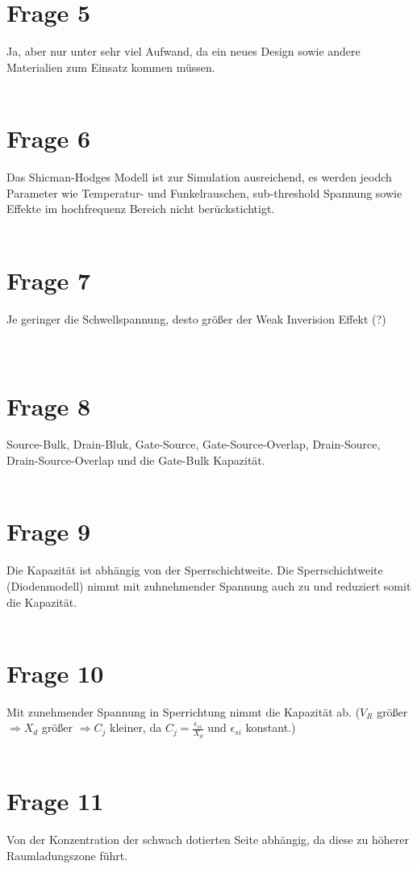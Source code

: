 \documentclass[a4paper]{scrartcl}
\begin{document}
\section*{Frage 5}
Ja, aber nur unter sehr viel Aufwand, da ein neues Design sowie andere Materialien zum Einsatz kommen müssen.
~\\
~\\
\section*{Frage 6}
Das Shicman-Hodges Modell ist zur Simulation ausreichend, es werden jeodch Parameter wie Temperatur- und Funkelrauschen, sub-threshold Spannung sowie Effekte im hochfrequenz Bereich nicht berückstichtigt.
~\\
~\\
\section*{Frage 7}
Je geringer die Schwellspannung, desto größer der Weak Inverision Effekt (?)\\

~\\
~\\
\section*{Frage 8}
Source-Bulk, Drain-Bluk, Gate-Source, Gate-Source-Overlap, Drain-Source, Drain-Source-Overlap und die Gate-Bulk Kapazität.
~\\
~\\
\section*{Frage 9}
Die Kapazität ist abhängig von der Sperrschichtweite. Die Sperrschichtweite (Diodenmodell) nimmt mit zuhnehmender Spannung auch zu und reduziert somit die Kapazität.
~\\
~\\
\section*{Frage 10}
Mit zunehmender Spannung in Sperrichtung nimmt die Kapazität ab. ($V_R$ größer $\Rightarrow X_d$ größer $\Rightarrow C_j$ kleiner, da $C_j = \frac{\epsilon_{si}}{X_d}$ und $\epsilon_{si}$ konstant.)
~\\
~\\
\section*{Frage 11}
Von der Konzentration der schwach dotierten Seite abhängig, da diese zu höherer Raumladungszone führt.
~\\
~\\
\end{document}
